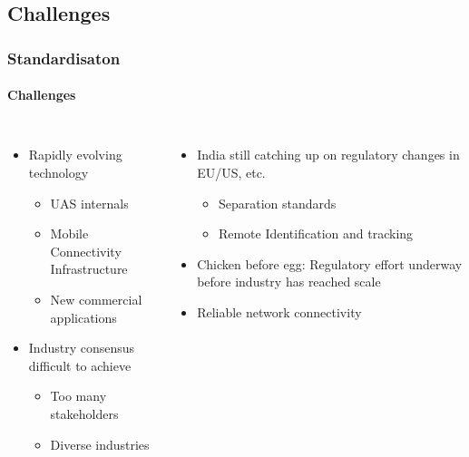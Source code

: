 \documentclass[usenames,dvipsnames,aspectratio=169,serif]{beamer}
\begin{document}
\subsection{Challenges}
\begin{frame}[fragile] %
   \frametitle{Standardisaton}
   \framesubtitle{Challenges}
   \begin{columns}[t]
      \begin{itemize}
         \item Rapidly evolving technology
            \begin{itemize}
               \item UAS internals
               \item Mobile Connectivity Infrastructure
               \item New commercial applications
            \end{itemize}
         \item Industry consensus difficult to achieve
            \begin{itemize}
                  \item Too many stakeholders
                  \item Diverse industries
            \end{itemize}
      \end{itemize}
      \begin{itemize}
         \item India still catching up on regulatory changes in EU/US, etc.
            \begin{itemize}
               \item Separation standards
               \item Remote Identification and tracking
            \end{itemize}
         \item Chicken before egg: Regulatory effort underway before industry has reached scale
         \item Reliable network connectivity
      \end{itemize}
   \end{columns}
\end{frame}

\end{document}
